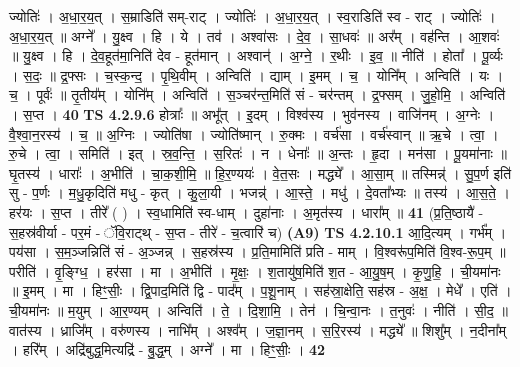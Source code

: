 \documentclass[17pt]{extarticle}
\begin{document}
                  ज्योतिः॑ । अ॒धा॒र॒य॒त् । स॒म्राडिति॑ सम्-राट् । ज्योतिः॑ । अ॒धा॒र॒य॒त् । स्व॒राडिति॑ स्व - राट् । ज्योतिः॑ । अ॒धा॒र॒य॒त् ॥ अग्ने᳚ । यु॒क्ष्व । हि । ये । तव॑ । अश्वा॑सः । दे॒व॒ । सा॒धवः॑ ॥ अर᳚म् । वह॑न्ति । आ॒शवः॑ ॥ यु॒क्ष्व । हि । दे॒व॒हूत॑मा॒निति॑ देव - हूत॑मान् । अश्वान्॑ । अ॒ग्ने॒ । र॒थीः । इ॒व॒ ॥ नीति॑ । होता᳚ । पू॒र्व्यः । स॒दः॒ ॥ द्र॒फ्सः । च॒स्क॒न्द॒ । पृ॒थि॒वीम् । अन्विति॑ । द्याम् । इ॒मम् । च॒ । योनि᳚म् । अन्विति॑ । यः । च॒ । पूर्वः॑ ॥ तृ॒तीय᳚म् । योनि᳚म् । अन्विति॑ । स॒ञ्चर॑न्त॒मिति॑ सं - चर॑न्तम् । द्र॒फ्सम् । जु॒हो॒मि॒ । अन्विति॑ । स॒प्त । \textbf{  40} \newline
                  \newline
                                \textbf{ TS 4.2.9.6} \newline
                  होत्राः᳚ ॥ अभू᳚त् । इ॒दम् । विश्व॑स्य । भुव॑नस्य । वाजि॑नम् । अ॒ग्नेः । वै॒श्वा॒न॒रस्य॑ । च॒ ॥ अ॒ग्निः । ज्योति॑षा । ज्योति॑ष्मान् । रु॒क्मः । वर्च॑सा । वर्च॑स्वान् ॥ ऋ॒चे । त्वा॒ । रु॒चे । त्वा॒ । समिति॑ । इत् । स्र॒व॒न्ति॒ । स॒रितः॑ । न । धेनाः᳚ ॥ अ॒न्तः । हृ॒दा । मन॑सा । पू॒यमा॑नाः ॥ घृ॒तस्य॑ । धाराः᳚ । अ॒भीति॑ । चा॒क॒शी॒मि॒ ॥ हि॒र॒ण्ययः॑ । वे॒त॒सः । मद्ध्ये᳚ । आ॒सा॒म् ॥ तस्मिन्न्॑ । सु॒प॒र्ण इति॑ सु - प॒र्णः । म॒धु॒कृदिति॑ मधु - कृत् । कु॒ला॒यी । भजन्न्॑ । आ॒स्ते॒ । मधु॑ । दे॒वता᳚भ्यः ॥ तस्य॑ । आ॒स॒ते॒ । हर॑यः । स॒प्त । तीरे᳚ ( ) । स्व॒धामिति॑ स्व-धाम् । दुहा॑नाः । अ॒मृत॑स्य । धारा᳚म् ॥ \textbf{  41} \newline
                  \newline
                      (प्र॒ति॒ष्ठायै॑ - स॒हस्र॑वीर्या - पर॒मं - ॅवि॒राट्थ् - स॒प्त - तीरे॑ - च॒त्वारि॑ च)  \textbf{(A9)} \newline \newline
                                \textbf{ TS 4.2.10.1} \newline
                  आ॒दि॒त्यम् । गर्भ᳚म् । पय॑सा । स॒म॒ञ्जन्निति॑ सं - अ॒ञ्जन्न् । स॒हस्र॑स्य । प्र॒ति॒मामिति॑ प्रति - माम् । वि॒श्वरू॑प॒मिति॑ वि॒श्व-रू॒प॒म् ॥ परीति॑ । वृ॒ङ्ग्धि॒ । हर॑सा । मा । अ॒भीति॑ । मृ॒क्षः॒ । श॒तायु॑ष॒मिति॑ श॒त - आ॒यु॒ष॒म् । कृ॒णु॒हि॒ । ची॒यमा॑नः ॥ इ॒मम् । मा । हिꣳ॒॒सीः॒ । द्वि॒पाद॒मिति॑ द्वि - पाद᳚म् । प॒शू॒नाम् । सह॑स्रा॒क्षेति॒ सह॑स्र - अ॒क्ष॒ । मेधे᳚ । एति॑ । ची॒यमा॑नः ॥ म॒युम् । आ॒र॒ण्यम् । अन्विति॑ । ते॒ । दि॒शा॒मि॒ । तेन॑ । चि॒न्वा॒नः । त॒नुवः॑ । नीति॑ । सी॒द॒ ॥ वात॑स्य । ध्राजि᳚म् । वरु॑णस्य । नाभि᳚म् । अश्व᳚म् । ज॒ज्ञा॒नम् । स॒रि॒रस्य॑ । मद्ध्ये᳚ ॥ शिशु᳚म् । न॒दीना᳚म् । हरि᳚म् । अद्रि॑बुद्ध॒मित्यद्रि॑ - बु॒द्ध॒म् । अग्ने᳚ । मा । हिꣳ॒॒सीः॒ । \textbf{  42} \newline
\end{document}

